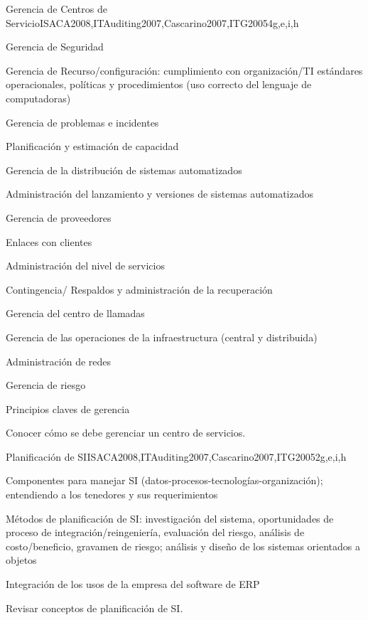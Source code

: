 \begin{syllabus}
	\begin{unit}{Gerencia de Centros de Servicio}{}{ISACA2008,ITAuditing2007,Cascarino2007,ITG2005}{4}{g,e,i,h}
	\begin{topics}
	\item Gerencia de Seguridad
	\item Gerencia de Recurso/configuración: cumplimiento con organización/TI estándares operacionales, políticas y procedimientos (uso correcto del lenguaje de computadoras)
	\item Gerencia de problemas e incidentes 
	\item Planificación y estimación de capacidad
	\item Gerencia de la distribución de sistemas automatizados
	\item Administración del lanzamiento y versiones de sistemas automatizados
	\item Gerencia de proveedores
	\item Enlaces con clientes
	\item Administración del nivel de servicios
	\item Contingencia/ Respaldos y administración de la recuperación
	\item Gerencia del centro de llamadas
	\item Gerencia de las operaciones de la infraestructura (central y distribuida)
	\item Administración de redes
	\item Gerencia de riesgo
	\item Principios claves de gerencia
	\end{topics}
	\begin{learningoutcomes}
	\item Conocer cómo se debe gerenciar un centro de servicios.
	\end{learningoutcomes}
	\end{unit}
	
	
	\begin{unit}{Planificación de SI}{}{ISACA2008,ITAuditing2007,Cascarino2007,ITG2005}{2}{g,e,i,h}
	\begin{topics}
	\item Componentes para manejar SI (datos-procesos-tecnologías-organización); entendiendo a los tenedores y sus requerimientos
	\item Métodos de planificación de SI: investigación del sistema, oportunidades de proceso de integración/reingeniería, evaluación del riesgo, análisis de costo/beneficio, gravamen de riesgo; análisis y diseño de los sistemas orientados a objetos
	\item Integración de los usos de la empresa del software de ERP
	\end{topics}
	\begin{learningoutcomes}
	\item Revisar conceptos de planificación de SI.
	\end{learningoutcomes}
	\end{unit}
	

\end{syllabus}
